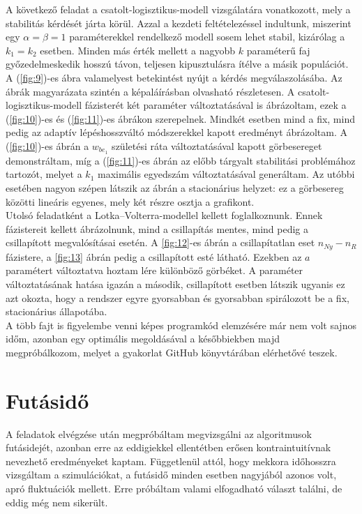 \begin{multicols}{2}
A következő feladat a csatolt-logisztikus-modell vizsgálatára vonatkozott, mely a stabilitás kérdését járta körül. Azzal a kezdeti feltételezéssel indultunk, miszerint egy $\alpha = \beta = 1$ paraméterekkel rendelkező modell sosem lehet stabil, kizárólag a $k_{1} = k_{2}$ esetben. Minden más érték mellett a nagyobb $k$ paraméterű faj győzedelmeskedik hosszú távon, teljesen kipusztulásra ítélve a másik populációt. A (\ref{fig:9})-es ábra valamelyest betekintést nyújt a kérdés megválaszolásába. Az ábrák magyarázata szintén a képaláírásban olvasható részletesen. A csatolt-logisztikus-modell fázisterét két paraméter változtatásával is ábrázoltam, ezek a (\ref{fig:10})-es és (\ref{fig:11})-es ábrákon szerepelnek. Mindkét esetben mind a fix, mind pedig az adaptív lépéshosszváltó módszerekkel kapott eredményt ábrázoltam. A (\ref{fig:10})-es ábrán a $w_{be_{1}}$ születési ráta változtatásával kapott görbesereget demonstráltam, míg a (\ref{fig:11})-es ábrán az előbb tárgyalt stabilitási problémához tartozót, melyet a $k_{1}$ maximális egyedszám változtatásával generáltam. Az utóbbi esetében nagyon szépen látszik az ábrán a stacionárius helyzet: ez a görbesereg  közötti lineáris egyenes, mely két részre osztja a grafikont. \\
Utolsó feladatként a Lotka--Volterra-modellel kellett foglalkoznunk. Ennek fázistereit kellett ábrázolnunk, mind a csillapítás mentes, mind pedig a csillapított megvalósításai esetén. A \ref{fig:12}-es ábrán a csillapítatlan eset $n_{Ny}-n_{R}$ fázistere, a \ref{fig:13} ábrán pedig a csillapított esté látható. Ezekben az $a$ paramétert változtatva hoztam lére különböző görbéket. A paraméter változtatásának hatása igazán a második, csillapított esetben látszik ugyanis ez azt okozta, hogy a rendszer egyre gyorsabban és gyorsabban spirálozott be a fix, stacionárius állapotába. \\
A több fajt is figyelembe venni képes programkód elemzésére már nem volt sajnos időm, azonban egy optimális megoldásával a későbbiekben majd megpróbálkozom, melyet a gyakorlat GitHub könyvtárában elérhetővé teszek.

\section{Futásidő} \label{sec:6}
A feladatok elvégzése után megpróbáltam megvizsgálni az algoritmusok futásidejét, azonban erre az eddigiekkel ellentétben erősen kontraintuitívnak nevezhető eredményeket kaptam. Függetlenül attól, hogy mekkora időhosszra vizsgáltam a szimulációkat, a futásidő minden esetben nagyjából azonos volt, apró fluktuációk mellett. Erre próbáltam valami elfogadható választ találni, de eddig még nem sikerült.


\end{multicols}
